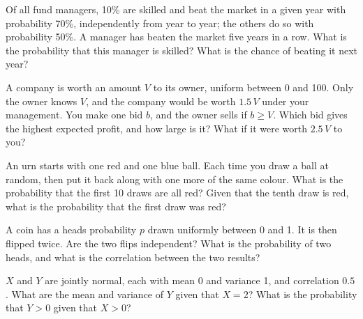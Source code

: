 \begin{question}\label{iq:iv1:conditional-probability-and-bayes:20}
Of all fund managers, 10\% are skilled and beat the market in a given year with probability 70\%, independently from year to year; the others do so with probability 50\%. A manager has beaten the market five years in a row. What is the probability that this manager is skilled? What is the chance of beating it next year?
\end{question}

\begin{question}\label{iq:iv1:conditional-probability-and-bayes:21}
A company is worth an amount $V$ to its owner, uniform between 0 and 100. Only the owner knows $V$, and the company would be worth $1.5\,V$ under your management. You make one bid $b$, and the owner sells if $b \ge V$. Which bid gives the highest expected profit, and how large is it? What if it were worth $2.5\,V$ to you?
\end{question}

\begin{question}\label{iq:iv1:conditional-probability-and-bayes:22}
An urn starts with one red and one blue ball. Each time you draw a ball at random, then put it back along with one more of the same colour. What is the probability that the first 10 draws are all red? Given that the tenth draw is red, what is the probability that the first draw was red?
\end{question}

\begin{question}\label{iq:iv1:conditional-probability-and-bayes:23}
A coin has a heads probability $p$ drawn uniformly between 0 and 1. It is then flipped twice. Are the two flips independent? What is the probability of two heads, and what is the correlation between the two results?
\end{question}

\begin{question}\label{iq:iv1:conditional-probability-and-bayes:24}
$X$ and $Y$ are jointly normal, each with mean 0 and variance 1, and correlation $0.5$. What are the mean and variance of $Y$ given that $X = 2$? What is the probability that $Y > 0$ given that $X > 0$?
\end{question}

